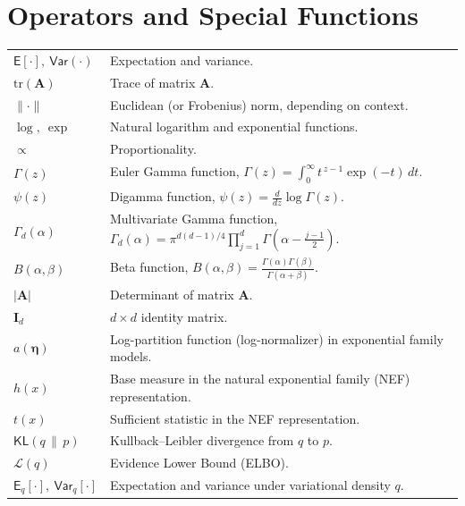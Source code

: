\section*{Operators and Special Functions}
\begin{tabularx}{\textwidth}{>{\raggedright\arraybackslash}p{3cm} X}
$\mathsf{E}[\cdot],\ \mathsf{Var}(\cdot)$ & Expectation and variance. \\
$\mathrm{tr}(\mathbf{A})$ & Trace of matrix $\mathbf{A}$. \\
$\lVert \cdot \rVert$ & Euclidean (or Frobenius) norm, depending on context. \\
$\log,\ \exp$ & Natural logarithm and exponential functions. \\
$\propto$ & Proportionality. \\
$\Gamma(z)$ & Euler Gamma function, $\displaystyle \Gamma(z) = \int_0^\infty t^{\,z-1}\exp(-t)\,dt$. \\
$\psi(z)$ & Digamma function, $\displaystyle \psi(z) = \frac{d}{dz}\log \Gamma(z)$. \\
$\Gamma_d(\alpha)$ & Multivariate Gamma function, $\displaystyle \Gamma_d(\alpha) = \pi^{d(d-1)/4}\prod_{j=1}^{d}\Gamma\!\left(\alpha-\tfrac{j-1}{2}\right)$. \\
$B(\alpha,\beta)$ & Beta function, $\displaystyle B(\alpha,\beta)=\frac{\Gamma(\alpha)\Gamma(\beta)}{\Gamma(\alpha+\beta)}$. \\
$|\mathbf{A}|$ & Determinant of matrix $\mathbf{A}$. \\
$\mathbf{I}_d$ & $d\times d$ identity matrix. \\
$a(\bm{\eta})$ & Log-partition function (log-normalizer) in exponential family models. \\
$h(x)$ & Base measure in the natural exponential family (NEF) representation. \\
$t(x)$ & Sufficient statistic in the NEF representation. \\
$\mathsf{KL}(q\,\|\,p)$ & Kullback–Leibler divergence from $q$ to $p$. \\
$\mathcal{L}(q)$ & Evidence Lower Bound (ELBO). \\
$\mathsf{E}_q[\cdot],\ \mathsf{Var}_q[\cdot]$ & Expectation and variance under variational density $q$. \\
\end{tabularx}

